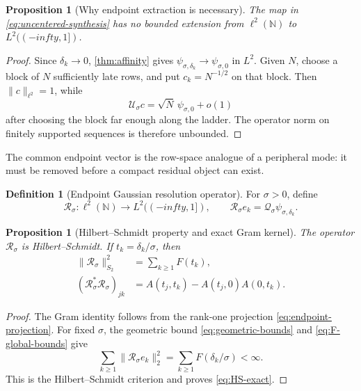 \documentclass[11pt]{article}
\newtheorem{proposition}[theorem]{Proposition}
\theoremstyle{definition}
\newtheorem{definition}[theorem]{Definition}
\theoremstyle{remark}
\newcommand{\N}{\mathbb N}
\newcommand{\cR}{\mathcal R}
\newcommand{\cU}{\mathcal U}
\newcommand{\cQ}{\mathcal Q}
\newcommand{\ellspace}{\ell^2(\N)}
\newcommand{\Hilbert}{L^2((-infty,1])}
\begin{document}
\begin{proposition}[Why endpoint extraction is necessary]
\label{prop:unbounded}
The map in \eqref{eq:uncentered-synthesis} has no bounded extension from
$\ellspace$ to $\Hilbert$.
\end{proposition}

\begin{proof}
Since $\delta_k\to0$, \cref{thm:affinity} gives
$\psi_{\sigma,\delta_k}\to\psi_{\sigma,0}$ in $L^2$.  Given $N$, choose a
block of $N$ sufficiently late rows, and put $c_k=N^{-1/2}$ on that block.
Then $\|c\|_{\ell^2}=1$, while
\[
 \cU_\sigma c
 =\sqrt N\,\psi_{\sigma,0}+o(1)
\]
after choosing the block far enough along the ladder.  The operator norm on
finitely supported sequences is therefore unbounded.
\end{proof}

The common endpoint vector is the row-space analogue of a peripheral mode:
it must be removed before a compact residual object can exist.

\begin{definition}[Endpoint Gaussian resolution operator]
\label{def:resolution-operator}
For $\sigma>0$, define
\begin{equation}\label{eq:R-definition}
 \cR_\sigma:\ellspace\longrightarrow\Hilbert,
 \qquad
 \cR_\sigma e_k
 =\cQ_\sigma\psi_{\sigma,\delta_k}.
\end{equation}
\end{definition}

\begin{proposition}[Hilbert--Schmidt property and exact Gram kernel]
\label{prop:gram}
The operator $\cR_\sigma$ is Hilbert--Schmidt.  If
$t_k=\delta_k/\sigma$, then
\begin{align}
 \|\cR_\sigma\|_{S_2}^2
 &=\sum_{k\ge1}F(t_k),
 \label{eq:HS-exact}\\
 (\cR_\sigma^*\cR_\sigma)_{jk}
 &=A(t_j,t_k)-A(t_j,0)A(0,t_k).
 \label{eq:Gram-exact}
\end{align}
\end{proposition}

\begin{proof}
The Gram identity follows from the rank-one projection
\eqref{eq:endpoint-projection}.  For fixed $\sigma$, the geometric bound
\eqref{eq:geometric-bounds} and \eqref{eq:F-global-bounds} give
\[
 \sum_{k\ge1}\|\cR_\sigma e_k\|_2^2
 =\sum_{k\ge1}F(\delta_k/\sigma)<\infty.
\]
This is the Hilbert--Schmidt criterion \citep{Simon2005} and proves
\eqref{eq:HS-exact}.
\end{proof}
\end{document}
